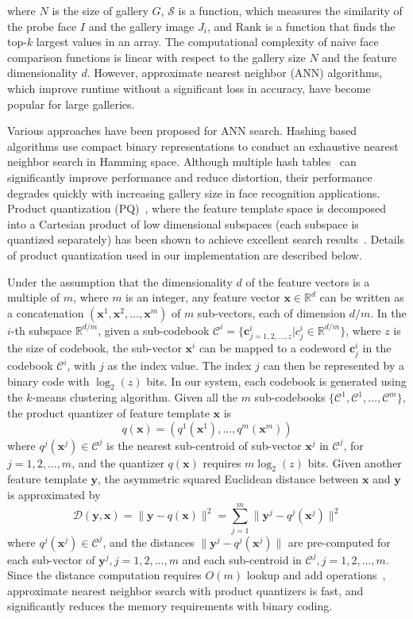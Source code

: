 \documentclass[10pt,journal,compsoc]{IEEEtran}
\def \c {{\mathbf{c}}}
\def \y {{\mathbf{l}}}
\def \x {{\mathbf{x}}}
\def \y {{\mathbf{y}}}
\begin{document}
\noindent where $N$ is the size of gallery $G$, $\mathcal{S}$ is a function, which measures the similarity of the probe face $I$ and the gallery image $J_i$, and $\mathrm{Rank}$ is a function that finds the top-$k$ largest values in an array. The computational complexity of naive face comparison functions is linear with respect to the gallery size $N$ and the feature dimensionality $d$. However, approximate nearest neighbor (ANN) algorithms, which improve runtime
without a significant loss in accuracy, have become popular for large galleries.

Various approaches have been proposed for ANN search. Hashing based algorithms use compact binary representations to conduct an exhaustive nearest neighbor search in Hamming space. Although multiple hash tables~\cite{retrieval:LSH} can significantly improve performance and reduce distortion, their performance degrades quickly with increasing gallery size in face recognition applications. Product quantization (PQ)~\cite{retrieval:pq}, where the feature template space is decomposed into a Cartesian product of low dimensional subspaces (each subspace is quantized separately) has been shown to achieve excellent search results~\cite{retrieval:pq}. Details of product quantization used in our implementation are described below.

Under the assumption that the dimensionality $d$ of the feature vectors is a multiple of $m$, where $m$ is an integer, any feature vector $\x \in \mathbb{R}^d$ can be written as a concatenation
$(\x^1, \x^2, \ldots, \x^m)$ of $m$ sub-vectors, each of dimension $d/m$. In the $i$-th subspace $\mathbb{R}^{d/m}$, given a sub-codebook $\mathcal{C}^i = \{ \c^i_{j=1,2,\ldots, z} | c^i_j \in \mathbb{R}^{d/m} \}$, where $z$ is the size of codebook, the sub-vector $\x^i$ can be mapped to a {codeword} $\c^i_j$ in the codebook $\mathcal{C}^i$,
with $j$ as the index value. The index $j$ can then be represented by a binary code with $\log_2(z)$ bits. In our system, each codebook is generated using the $k$-means clustering algorithm. Given all the $m$ sub-codebooks $\{ \mathcal{C}^1, \mathcal{C}^1, \ldots, \mathcal{C}^m \}$, the product quantizer of feature template $\x$ is
$$q(\x) = (q^1(\x^1), \ldots, q^m(\x^m))$$
where $q^j(\x^j) \in \mathcal{C}^j$ is the nearest sub-centroid of sub-vector $\x^j$ in $\mathcal{C}^j$, for $j = 1, 2, \dots, m$, and the quantizer $q(\x)$ requires $m\log_2(z)$ bits. Given another feature template $\y$, the asymmetric squared Euclidean distance between $\x$ and $\y$ is approximated by $$\mathcal{D}(\y, \x) = \| \y - q(\x) \|^2 = \sum_{j=1}^{m} \| \y^j - q^j(\x^j)\|^2$$
where $q^j(\x^j) \in \mathcal{C}^j$, and the distances $\| \y^j - q^j(\x^j)\|$ are pre-computed for each sub-vector of $\y^j, j=1,2, \ldots, m$ and each sub-centroid in $\mathcal{C}^j, j=1, 2, \ldots, m$. Since the distance computation requires $O(m)$ lookup and add operations~\cite{retrieval:pq}, approximate nearest neighbor search with product quantizers is fast, and significantly reduces the memory requirements with binary coding.
\end{document}
